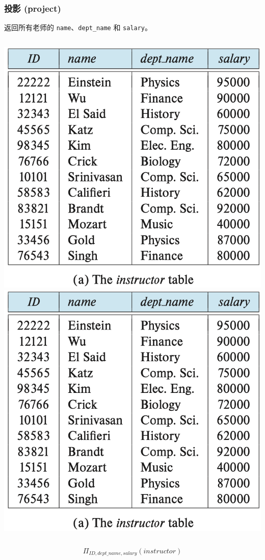 \documentclass[aspectratio=169, 14pt]{beamer}
\begin{document}
\begin{frame}
    \frametitle{投影 (project)}
    返回所有老师的 \texttt{name}、\texttt{dept\_name} 和 \texttt{salary}。
    \begin{columns}
        \includegraphics[width=\textwidth, trim={0 4.4cm 0 0},clip]{table/instructor}
        \includegraphics[height=.4\paperheight, trim={2.8cm 4.4cm 0 0},clip]{table/instructor}
        \pause
    \end{columns}
    \large{\[\Pi_{ID, dept\_name, salary}(instructor)\]}
\end{frame}
\end{document}
